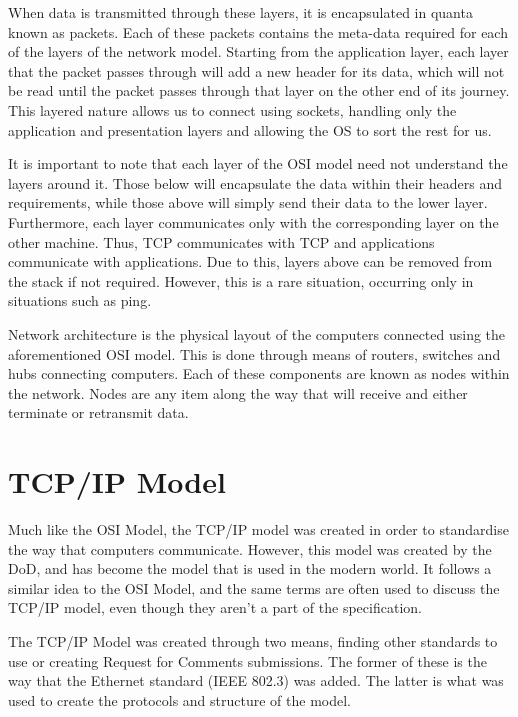 		When data is transmitted through these layers, it is encapsulated in quanta known as packets.
		Each of these packets contains the meta-data required for each of the layers of the network model.
		Starting from the application layer, each layer that the packet passes through will add a new header for its data, which will not be read until the packet passes through that layer on the other end of its journey.
		This layered nature allows us to connect using sockets, handling only the application and presentation layers and allowing the OS to sort the rest for us.

		It is important to note that each layer of the OSI model need not understand the layers around it.
		Those below will encapsulate the data within their headers and requirements, while those above will simply send their data to the lower layer.
		Furthermore, each layer communicates only with the corresponding layer on the other machine.
		Thus, TCP communicates with TCP and applications communicate with applications.
		Due to this, layers above can be removed from the stack if not required.
		However, this is a rare situation, occurring only in situations such as ping.

		Network architecture is the physical layout of the computers connected using the aforementioned OSI model.
		This is done through means of routers, switches and hubs connecting computers.
		Each of these components are known as nodes within the network.
		Nodes are any item along the way that will receive and either terminate or retransmit data.

	\section{TCP/IP Model}
		Much like the OSI Model, the TCP/IP model was created in order to standardise the way that computers communicate.\cite{ICND1}
		However, this model was created by the DoD, and has become the model that is used in the modern world.
		It follows a similar idea to the OSI Model, and the same terms are often used to discuss the TCP/IP model, even though they aren't a part of the specification.

		The TCP/IP Model was created through two means, finding other standards to use or creating Request for Comments submissions.
		The former of these is the way that the Ethernet standard (IEEE 802.3) was added.
		The latter is what was used to create the protocols and structure of the model.

